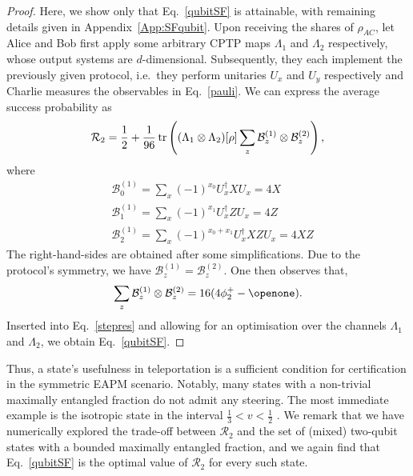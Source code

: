 \documentclass[aps,superscriptaddress,twocolumn,twoside,floatfix,pra,nofootinbib,a4paper]{revtex4-2}
\begin{document}
\begin{proof} Here, we show only that Eq.~\eqref{qubitSF} is attainable, with remaining details given in Appendix~\ref{App:SFqubit}.  Upon receiving the shares of $\rho_{AC}$, let Alice and Bob first apply some arbitrary CPTP maps $\Lambda_1$ and $\Lambda_2$ respectively, whose output systems are $d$-dimensional. Subsequently, they each implement the previously given protocol, i.e.~they perform unitaries $U_x$ and $U_y$ respectively and Charlie measures the observables in Eq.~\eqref{pauli}. We can express the average success probability as  
	\begin{equation}\label{stepres}
	\mathcal{R}_2=\frac{1}{2}+\frac{1}{96} \tr\left((\Lambda_1 \otimes \Lambda_2) [\rho]  \sum_z \mathcal{B}^{(1)}_z \otimes \mathcal{B}^{(2)}_z   \right),
	\end{equation}
	where
	\begin{align}\nonumber
	&\mathcal{B}_0^{(1)}=\sum_{x}(-1)^{x_0}U_{x}^\dagger X U_{x}=4X \\\nonumber
	& \mathcal{B}_1^{(1)}=\sum_{x}(-1)^{x_1}U_{x}^\dagger Z U_{x} =4Z\\
	& \mathcal{B}_2^{(1)}=\sum_{x}(-1)^{x_0+x_1}U_{x}^\dagger XZ U_{x}=4XZ
	\end{align}
	 The right-hand-sides are obtained after some simplifications.  Due to the protocol's symmetry, we have $\mathcal{B}_z^{(1)}=\mathcal{B}_z^{(2)}$. One then observes that, 
	\begin{equation}
	\sum_z \mathcal{B}^{(1)}_z \otimes \mathcal{B}^{(2)}_z	=16(4\phi^+_2 -\openone).
	\end{equation}
	Inserted into Eq.~\eqref{stepres} and allowing for an optimisation over the channels $\Lambda_1$ and $\Lambda_2$, we obtain Eq.~\eqref{qubitSF}.
\end{proof}
Thus, a state's usefulness in teleportation is a sufficient condition for certification in the symmetric EAPM scenario. Notably,  many states with a non-trivial maximally entangled fraction do not admit any steering. The most  immediate example is  the isotropic state in the interval $\frac{1}{3}<v<\frac{1}{2}$ \cite{Wiseman2007}. %
We remark that we have numerically explored the trade-off between $\mathcal{R}_2$ and the set of (mixed) two-qubit states with a bounded maximally entangled fraction, and we again find that Eq.~\eqref{qubitSF} is the optimal value of $\mathcal{R}_2$ for every such state.
\end{document}
